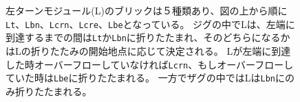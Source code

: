 \documentclass[a4,11pt]{article}
\begin{document}
%
%
\begin{figure}[p]
  \centering
 \caption{左ターンモジュール(L)のブリックは５種類あり、図の上から順に\texttt{Lt}、\texttt{Lbn}、\texttt{Lcrn}、\texttt{Lcre}、\texttt{Lbe}となっている。
ジグの中でLは、左端に到達するまでの間は\texttt{Lt}か\texttt{Lbn}に折りたたまれ、そのどちらになるかはLの折りたたみの開始地点に応じて決定される。
Lが左端に到達した時オーバーフローしていなければ\texttt{Lcrn}、もしオーバーフローしていた時は\texttt{Lbe}に折りたたまれる。
一方でザグの中ではLは\texttt{Lbn}にのみ折りたたまれる。}
 \label{fig:leftturns}
\end{figure}
\end{document}
